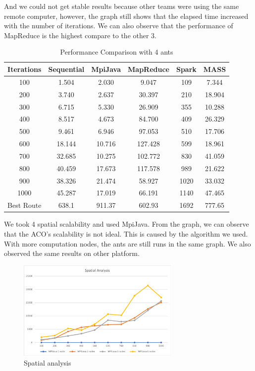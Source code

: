 \documentclass[11pt, letterpaper]{article}
\begin{document}
	\noindent And we could not get stable results because other teams were using the same remote computer, however, the graph still shows that the elapsed time increased with the number of iterations. We can also observe that the performance of MapReduce is the highest compare to the other 3.

	\begin{table}[H]
		\centering
		\begin{tabular}{|c|c|c|c|c|c|}
			\hline 
			Iterations		& Sequential 	& MpiJava 	& MapReduce & Spark 	& MASS \\
			\hline			
			100 			& 1.504 		& 2.030		& 9.047		& 109  		& 7.344 \\
			\hline
			200 			& 3.740			& 2.637	 	& 30.397 	& 210  		& 18.904 \\
			\hline
			300 			& 6.715			& 5.330 	& 26.909	& 355		& 10.288 \\
			\hline
			400 			& 8.517			& 4.673		& 84.700	& 409		& 26.329 \\
			\hline
			500 			& 9.461			& 6.946		& 97.053	& 510		& 17.706 \\
			\hline
			600 			& 18.144		& 10.716	& 127.428 	& 599		& 18.961 \\
			\hline
			700 			& 32.685		& 10.275	& 102.772	& 830		& 41.059 \\
			\hline
			800 			& 40.459		& 17.673 	& 117.578	& 989  		& 21.622 \\
			\hline
			900 			& 38.326		& 21.474 	& 58.927 	& 1020 		& 33.032 \\
			\hline
			1000			& 45.287 		& 17.019 	& 66.191	& 1140		& 47.465 \\
			\hline
			Best Route		& 638.1			& 911.37 	&  602.93	& 1692 		& 777.65 \\
			\hline
		\end{tabular}
		\caption{Performance Comparison with 4 ants}
	\end{table}
	
	We took 4 spatial scalability and used MpiJava. From the graph, we can observe that the ACO's scalability is not ideal. This is caused by the algorithm we used. With more computation nodes, the ants are still runs in the same graph. We also observed the same results on other platform.
	
	\begin{figure}[H]
		\centering
		\includegraphics[width=0.7\textwidth]{sana}
		\caption{Spatial analysis}
	\end{figure}
	
\end{document}
